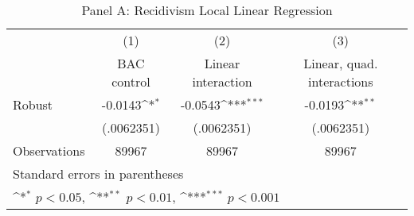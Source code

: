 \begin{table}[htbp]\centering
\def\sym#1{\ifmmode^{#1}\else\(^{#1}\)\fi}
\caption{Panel A: Recidivism Local Linear Regression}
\begin{tabular}{l*{3}{c}}
\hline\hline
                    &\multicolumn{1}{c}{(1)}&\multicolumn{1}{c}{(2)}&\multicolumn{1}{c}{(3)}\\
                    &\multicolumn{1}{c}{BAC control}&\multicolumn{1}{c}{Linear interaction}&\multicolumn{1}{c}{Linear, quad. interactions}\\
\hline
Robust              &     -0.0143\sym{*}  &     -0.0543\sym{***}&     -0.0193\sym{**} \\
                    &  (.0062351)         &  (.0062351)         &  (.0062351)         \\
\hline
Observations        &       89967         &       89967         &       89967         \\
\hline\hline
\multicolumn{4}{l}{\footnotesize Standard errors in parentheses}\\
\multicolumn{4}{l}{\footnotesize \sym{*} \(p<0.05\), \sym{**} \(p<0.01\), \sym{***} \(p<0.001\)}\\
\end{tabular}
\end{table}
